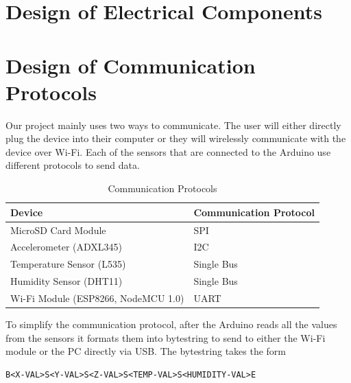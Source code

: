 \documentclass[12pt, titlepage]{article}
\begin{document}

\section{Design of Electrical Components}



\newpage
\section{Design of Communication Protocols}
Our project mainly uses two ways to communicate. The user will either directly plug the device into their computer or they will wirelessly communicate with the device over Wi-Fi. Each of the sensors that are connected to the Arduino use different protocols to send data.


\begin{table}[!h]
\begin{tabular}{| p{} | p{}|}
  \hline
  \rowcolor[gray]{0.9}
  Device & Communication Protocol \\
  \hline
  MicroSD Card Module & SPI\\
  \hline
  Accelerometer (ADXL345) &  I2C\\
  \hline
  Temperature Sensor (L535) & Single Bus \\
  \hline
  Humidity Sensor (DHT11) & Single Bus \\
  \hline
  Wi-Fi Module (ESP8266, NodeMCU 1.0) & UART \\
  \hline
 
\end{tabular}
\caption{Communication Protocols}
\end{table}




To simplify the communication protocol, after the Arduino reads all the values from the sensors it formats them into bytestring to send to either the Wi-Fi module or the PC directly via USB. The bytestring takes the form

\begin{verbatim}
B<X-VAL>S<Y-VAL>S<Z-VAL>S<TEMP-VAL>S<HUMIDITY-VAL>E
\end{verbatim}
\end{document}
